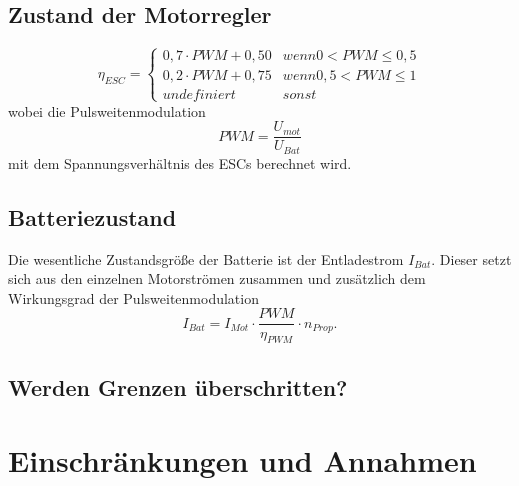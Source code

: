 \subsection{Zustand der Motorregler}

\begin{equation}
\eta_{ESC} = \begin{cases} 
0,7\cdot PWM + 0,50 & wenn 0 < PWM \leq 0,5 \\ 
0,2\cdot PWM + 0,75 & wenn 0,5 < PWM \leq 1 \\ 
undefiniert & sonst 
\end{cases}
\end{equation}
wobei die Pulsweitenmodulation 
\begin{equation}
	PWM = \frac{U_{mot}}{U_{Bat}}
\end{equation}
mit dem Spannungsverhältnis des ESCs berechnet wird.
\subsection{Batteriezustand}
Die wesentliche Zustandsgröße der Batterie ist der Entladestrom \ensuremath{I_{Bat}}. Dieser setzt sich aus den einzelnen Motorströmen zusammen und zusätzlich dem Wirkungsgrad der Pulsweitenmodulation
\begin{equation}
	I_{Bat} = I_{Mot}\cdot \frac{PWM}{\eta_{PWM}}\cdot n_{Prop}.
\end{equation}


\subsection{Werden Grenzen überschritten?}
\section{Einschränkungen und Annahmen}